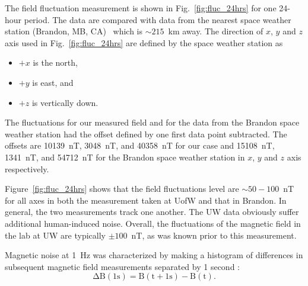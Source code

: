 The field fluctuation measurement is shown in Fig.~\ref{fig:fluc_24hrs} for one 24-hour period. The data are compared with data from the nearest space weather station (Brandon, MB, CA)~\cite{weather_station} which is $\sim215$~km away. The direction of $x$, $y$ and $z$ axis used in Fig.~\ref{fig:fluc_24hrs} are defined by the space weather station as
\begin{itemize}
    \item $+x$ is the north,
    \item $+y$ is east, and
    \item $+z$ is vertically down.
\end{itemize}
The fluctuations for our measured field and for the data from the Brandon space weather station had the offset defined by one first data point subtracted. The offsets are 10139~nT, 3048~nT, and 40358~nT for our case and 15108~nT, 1341~nT, and 54712~nT for the Brandon space weather station in $x$, $y$ and $z$ axis respectively.


Figure~\ref{fig:fluc_24hrs} shows that the field fluctuations level are $\sim50-100$~nT for all axes in both the measurement taken at UofW and that in Brandon. In general, the two measurements track one another. The UW data obviously suffer additional human-induced noise. Overall, the fluctuations of the magnetic field in the lab at UW are typically $\pm100$~nT, as was known prior to this measurement.



Magnetic noise at 1~Hz was characterized by making a histogram of differences in subsequent magnetic field measurements separated by 1 second :
\begin{equation}
    \mathrm{\Delta B (1s)=B(t+1s)-B(t)}.
\end{equation}


